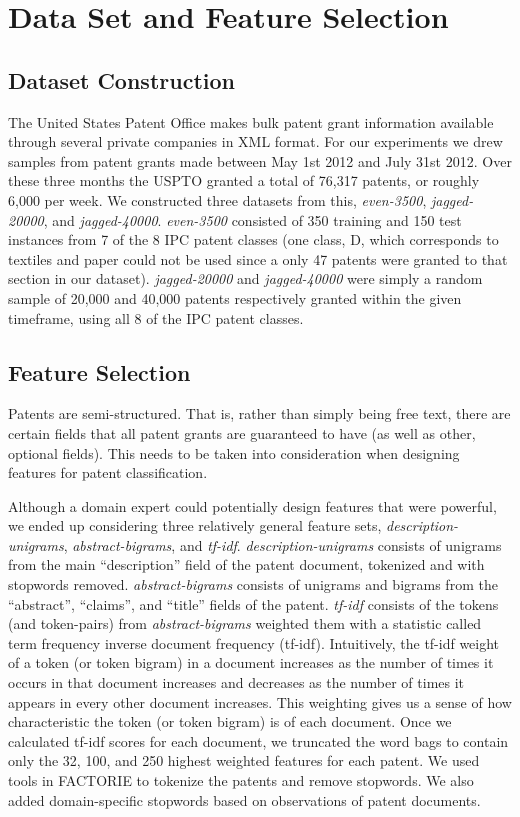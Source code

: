 \section{Data Set and Feature Selection}

\subsection{Dataset Construction}
\indent
The United States Patent Office makes bulk patent grant information available through several private companies\cite{USPTO:2013:patent-catalog} in XML format\cite{USPTO:2013:dtd}. For our experiments we drew samples from patent grants made between May 1st 2012 and July 31st 2012. Over these three months the USPTO granted a total of 76,317 patents, or roughly 6,000 per week. We constructed three datasets from this, \emph{even-3500}, \emph{jagged-20000}, and \emph{jagged-40000}. \emph{even-3500} consisted of 350 training and 150 test instances from 7 of the 8 IPC patent classes (one class, D, which corresponds to textiles and paper could not be used since a only 47 patents were granted to that section in our dataset). \emph{jagged-20000} and \emph{jagged-40000} were simply a random sample of 20,000 and 40,000 patents respectively granted within the given timeframe, using all 8 of the IPC patent classes.

\subsection{Feature Selection}
\indent
Patents are semi-structured. That is, rather than simply being free text, there are certain fields that all patent grants are guaranteed to have (as well as other, optional fields). This needs to be taken into consideration when designing features for patent classification. 

Although a domain expert could potentially design features that were powerful, we ended up considering three relatively general feature sets, \emph{description-unigrams}, \emph{abstract-bigrams}, and \emph{tf-idf}. \emph{description-unigrams} consists of unigrams from the main ``description'' field of the patent document, tokenized and with stopwords removed. \emph{abstract-bigrams} consists of unigrams and bigrams from the ``abstract'', ``claims'', and ``title'' fields of the patent. \emph{tf-idf} consists of the tokens (and token-pairs) from \emph{abstract-bigrams} weighted them with a statistic called term frequency inverse document frequency (tf-idf)\cite{manning:2008:IR}. Intuitively, the tf-idf weight of a token (or token bigram) in a document increases as the number of times it occurs in that document increases and decreases as the number of times it appears in every other document increases. This weighting gives us a sense of how characteristic the token (or token bigram) is of each document. Once we calculated tf-idf scores for each document, we truncated the word bags to contain only the 32, 100, and 250 highest weighted features for each patent. We used tools in FACTORIE\cite{mccallum09:factorie:} to tokenize the patents and remove stopwords. We also added domain-specific stopwords based on observations of patent documents. 


